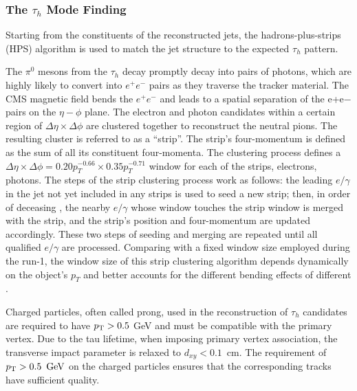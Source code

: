 \subsubsection{The $\tau_h$ Mode Finding}

Starting from the constituents of the reconstructed jets, the hadrons-plus-strips (HPS) algorithm is used to match the jet structure to the expected $\tau_h$ pattern. 

The $\pi^0$ mesons from the $\tau_h$ decay promptly decay into pairs of photons, which are highly likely to convert into $e^+e^-$ pairs as they traverse the tracker material. The CMS magnetic field bends the $e^+e^-$ and leads to a spatial separation of the e+e− pairs on the $\eta-\phi$ plane. The electron and photon candidates within a certain region of $\Delta\eta \times \Delta \phi$  are clustered together to reconstruct the neutral pions. The resulting cluster is referred to as a “strip”. The strip's four-momentum is defined as the sum of all its constituent four-momenta. The clustering process defines a $\Delta\eta \times \Delta \phi = 0.20p_T^{-0.66} \times 0.35 p_T^{-0.71}$ window for each of the strips, electrons, photons. The steps of the strip clustering process work as follows: the leading $e/\gamma$ in the jet not yet included in any strips is used to seed a new strip; then, in order of deceasing \pt, the nearby $e/\gamma$ whose window touches the strip window is merged with the strip, and the strip's position and four-momentum are updated accordingly. These two steps of seeding and merging are repeated until all qualified $e/\gamma$ are processed. Comparing with a fixed window size employed during the run-1, the window size of this strip clustering algorithm depends dynamically on the object's $p_T$ and better accounts for the different bending effects of different \pt.

Charged particles, often called prong, used in the reconstruction of $\tau_h$ candidates are required to have $p_{\mathrm{T}}>0.5$ GeV and must be compatible with the primary vertex. Due to the tau lifetime, when imposing primary vertex association, the transverse impact parameter is relaxed to $d_{xy}<0.1$~cm. The requirement of $p_{\mathrm{T}} > 0.5~\,\text{Ge\hspace{-.08em}V}$ on the charged particles ensures that the corresponding tracks have sufficient quality.

